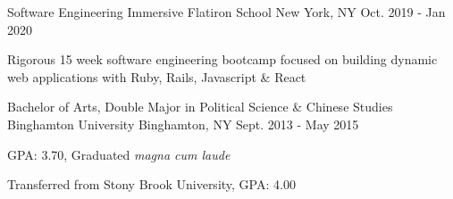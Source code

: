 
\begin{cventries}

  \cventry
    {Software Engineering Immersive} %
    {Flatiron School\vspace{-2.0mm}} %
    {New York, NY\vspace{-2.0mm}} %
    {Oct. 2019 - Jan 2020} %
    {
      \begin{cvitems} %
        \item {Rigorous 15 week software engineering bootcamp focused on building dynamic web applications with Ruby, Rails, Javascript \& React}
      \end{cvitems}
  }


  \cventry
    {Bachelor of Arts, Double Major in Political Science \& Chinese Studies} %
    {Binghamton University\vspace{-2.0mm}} %
    {Binghamton, NY\vspace{-2.0mm}} %
    {Sept. 2013 - May 2015} %
    {
      \begin{cvitems} %
        \item {GPA: 3.70, Graduated \textit{magna cum laude}}
        \item Transferred from Stony Brook University, GPA: 4.00
      \end{cvitems}
    }



\end{cventries}
